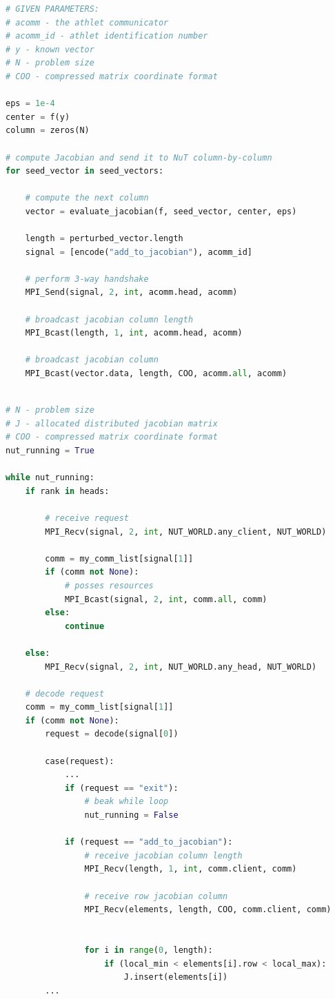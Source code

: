 \begin{minipage}{\linewidth}
\begin{lstlisting}[language=python, caption={Pseudocode of the default ATHLET-NuT coupling: ATHLET part}, frame=single, label={lst:athlet-grs-defaul:athlet}]
# GIVEN PARAMETERS:
# acomm - the athlet communicator
# acomm_id - athlet identification number 
# y - known vector
# N - problem size
# COO - compressed matrix coordinate format

eps = 1e-4
center = f(y)
column = zeros(N)

# compute Jacobian and send it to NuT column-by-column
for seed_vector in seed_vectors:

	# compute the next column
	vector = evaluate_jacobian(f, seed_vector, center, eps)
	
	length = perturbed_vector.length
	signal = [encode("add_to_jacobian"), acomm_id]
	
	# perform 3-way handshake
	MPI_Send(signal, 2, int, acomm.head, acomm)
	
	# broadcast jacobian column length
	MPI_Bcast(length, 1, int, acomm.head, acomm)
	
	# broadcast jacobian column
	MPI_Bcast(vector.data, length, COO, acomm.all, acomm)
	

\end{lstlisting}
\end{minipage}



\begin{minipage}{\linewidth}
\begin{lstlisting}[language=python, caption={Pseudocode of the default ATHLET-NuT coupling: NuT part}, frame=single, label={lst:athlet-grs-defaul:nut}]
# N - problem size
# J - allocated distributed jacobian matrix
# COO - compressed matrix coordinate format
nut_running = True

while nut_running:
	if rank in heads:
		
		# receive request
		MPI_Recv(signal, 2, int, NUT_WORLD.any_client, NUT_WORLD)
		
		comm = my_comm_list[signal[1]]
		if (comm not None):
			# posses resources
			MPI_Bcast(signal, 2, int, comm.all, comm)
		else:
			continue
		
	else:
		MPI_Recv(signal, 2, int, NUT_WORLD.any_head, NUT_WORLD)
		
	# decode request
	comm = my_comm_list[signal[1]]
	if (comm not None):	
		request = decode(signal[0])
	
		case(request):
			...
			if (request == "exit"):
				# beak while loop			
				nut_running = False
			
			if (request == "add_to_jacobian"):
				# receive jacobian column length
				MPI_Recv(length, 1, int, comm.client, comm)
	
				# receive row jacobian column
				MPI_Recv(elements, length, COO, comm.client, comm)

			
				for i in range(0, length):
					if (local_min < elements[i].row < local_max):
						J.insert(elements[i])
		...

\end{lstlisting}
\end{minipage}




